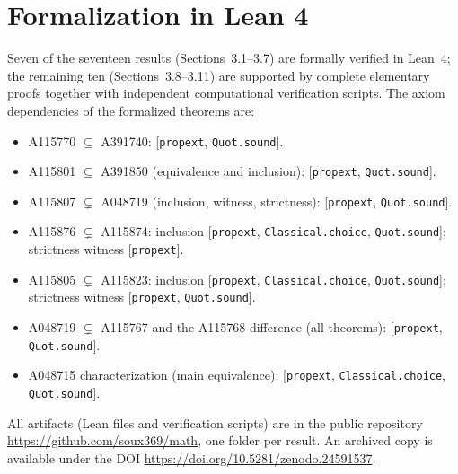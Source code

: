 \documentclass[11pt]{article}
\begin{document}
\section{Formalization in Lean 4}
\label{sec:formalization}
Seven of the seventeen results (Sections~3.1--3.7) are formally verified in Lean~4; the remaining ten (Sections~3.8--3.11) are supported by complete elementary proofs together with independent computational verification scripts. The axiom dependencies of the formalized theorems are:
\begin{itemize}
\item A115770 $\subseteq$ A391740: [\texttt{propext},
  \texttt{Quot.sound}]. %
\item A115801 $\subseteq$ A391850 (equivalence and inclusion):
  [\texttt{propext}, \texttt{Quot.sound}].
\item A115807 $\subsetneq$ A048719 (inclusion, witness, strictness):
  [\texttt{propext}, \texttt{Quot.sound}].
\item A115876 $\subsetneq$ A115874: inclusion [\texttt{propext},
  \texttt{Classical.choice}, \texttt{Quot.sound}]; strictness witness
  [\texttt{propext}]. %
\item A115805 $\subsetneq$ A115823: inclusion [\texttt{propext},
  \texttt{Classical.choice}, \texttt{Quot.sound}]; strictness witness
  [\texttt{propext}, \texttt{Quot.sound}].
\item A048719 $\subsetneq$ A115767 and the A115768 difference (all
  theorems): [\texttt{propext}, \texttt{Quot.sound}].
\item A048715 characterization (main equivalence): [\texttt{propext},
  \texttt{Classical.choice}, \texttt{Quot.sound}].
\end{itemize}
All artifacts (Lean files and verification scripts) are in the public
repository \url{https://github.com/soux369/math}, one folder per
result. An archived copy is available under the DOI
\url{https://doi.org/10.5281/zenodo.24591537}.
\end{document}
